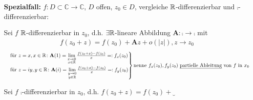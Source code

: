     \textbf{Spezialfall:} $f: D \subset \mathbb{C} \to \mathbb{C}$, $D$ offen, $z_0 \in D$, vergleiche $\mathbb{R}$-differenzierbar und $\comp$-differenzierbar:
    \begin{compactitem}
        \item Sei $f$ $\mathbb{R}$-differenzierbar in $z_0$, d.h. $\exists \mathbb{R}$-lineare Abbildung $\mathbf{A}: \comp \to \comp$ mit
            \begin{align}
                f(z_0 + z) = f(z_0) + \mathbf{A}z + o(\vert z \vert), z \to z_0
            \end{align}
            \begin{align}
                \begin{rcases}
                    &\text{für } z = x,x \in \mathbb{R}\colon \mathbf{A}(1) = \lim\limits_{\substack{x\to 0 \\ x\in \mathbb{R}}} \frac{f(z_0 + x) - f(z_0)}{x} =: f_x(z_0)\\
                    &\text{für } z = iy,y \in \mathbb{R}\colon \mathbf{A}(i) = \lim\limits_{\substack{y\to 0 \\ y\in \mathbb{R}}} \frac{f(z_0 + x) - f(z_0)}{x} =: f_y(z_0) \label{eq:R-diffbar}
                \end{rcases}
                \text{nenne } f_x(z_0),f_y(z_0) \text{ \emph{partielle Ableitung} von } f \text{ in } x_0
            \end{align}
            \item Sei $f$ $\comp$-differenzierbar in $z_0$, d.h. $f(z_0 +z) = f(z_0) +\underbrace{}$
    \end{compactitem}